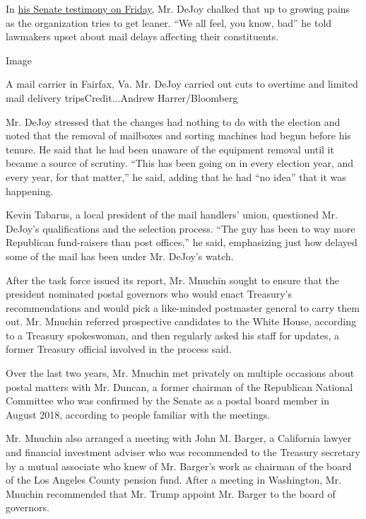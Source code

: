 In
\href{https://www.nytimes3xbfgragh.onion/2020/08/21/us/politics/dejoy-postal-service-senate-hearing.html}{his
Senate testimony on Friday}, Mr. DeJoy chalked that up to growing pains
as the organization tries to get leaner. ``We all feel, you know, bad''
he told lawmakers upset about mail delays affecting their constituents.

Image

A mail carrier in Fairfax, Va. Mr. DeJoy carried out cuts to overtime
and limited mail delivery tripsCredit...Andrew Harrer/Bloomberg

Mr. DeJoy stressed that the changes had nothing to do with the election
and noted that the removal of mailboxes and sorting machines had begun
before his tenure. He said that he had been unaware of the equipment
removal until it became a source of scrutiny. ``This has been going on
in every election year, and every year, for that matter,'' he said,
adding that he had ``no idea'' that it was happening.

Kevin Tabarus, a local president of the mail handlers' union, questioned
Mr. DeJoy's qualifications and the selection process. ``The guy has been
to way more Republican fund-raisers than post offices,'' he said,
emphasizing just how delayed some of the mail has been under Mr. DeJoy's
watch.

After the task force issued its report, Mr. Mnuchin sought to ensure
that the president nominated postal governors who would enact Treasury's
recommendations and would pick a like-minded postmaster general to carry
them out. Mr. Mnuchin referred prospective candidates to the White
House, according to a Treasury spokeswoman, and then regularly asked his
staff for updates, a former Treasury official involved in the process
said.

Over the last two years, Mr. Mnuchin met privately on multiple occasions
about postal matters with Mr. Duncan, a former chairman of the
Republican National Committee who was confirmed by the Senate as a
postal board member in August 2018, according to people familiar with
the meetings.

Mr. Mnuchin also arranged a meeting with John M. Barger, a California
lawyer and financial investment adviser who was recommended to the
Treasury secretary by a mutual associate who knew of Mr. Barger's work
as chairman of the board of the Los Angeles County pension fund. After a
meeting in Washington, Mr. Mnuchin recommended that Mr. Trump appoint
Mr. Barger to the board of governors.

